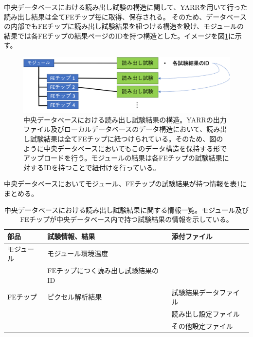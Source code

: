 中央データベースにおける読み出し試験の構造に関して、YARRを用いて行った読み出し結果は全てFEチップ毎に取得、保存される。
そのため、データベースの内部でもFEチップに読み出し試験結果を紐つける構造を設け、モジュールの結果では各FEチップの結果ページのIDを持つ構造とした。イメージを図\ref{structure_for_electrical_tests}に示す。

\begin{figure}[bpt]\centering
  \begin{center}
  \includegraphics[width=13cm]{structure_for_electrical_tests.png}
  \caption[中央データベースにおける読み出し試験結果の構造]{中央データベースにおける読み出し試験結果の構造。YARRの出力ファイル及びローカルデータベースのデータ構造において、読み出し試験結果は全てFEチップに紐つけられている。そのため、図のように中央データベースにおいてもこのデータ構造を保持する形でアップロードを行う。モジュールの結果は各FEチップの試験結果に対するIDを持つことで紐付けを行っている。}
  \label{structure_for_electrical_tests}
  \end{center}
\end{figure}

中央データベースにおいてモジュール、FEチップの試験結果が持つ情報を表\ref{electrical_parameters}にまとめる。
\begin{table}[tbp]
\begin{center}
\caption[中央データベースにおける読み出し試験結果に関する情報一覧]{中央データベースにおける読み出し試験結果に関する情報一覧。モジュール及びFEチップが中央データベース内で持つ試験結果の情報を示している。}
\label{electrical_parameters}
  \begin{tabular}{|l|l|l|} \hline
    部品 & 試験情報、結果 & 添付ファイル \\ \hline\hline
    モジュール &  モジュール環境温度 & \\  
               &  FEチップにつく読み出し試験結果のID & \\  \hline
    FEチップ &  ピクセル解析結果 & 試験結果データファイル\\ 
             &                   & 読み出し設定ファイル\\
             &                   & その他設定ファイル\\ \hline 
  \end{tabular}
\end{center}
\end{table}

